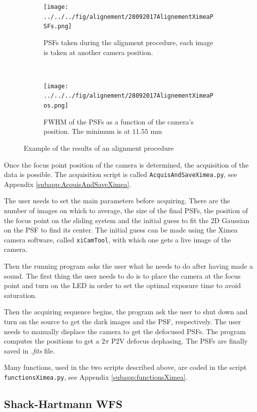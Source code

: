 \begin{figure}
\centering
    \begin{subfigure}{\textwidth}
        \texttt{[image: ../../../fig/alignement/28092017AlignementXimeaPSFs.png]}
        \caption{PSFs taken during the alignment procedure, each image is taken at another camera position.}
        \label{subfig:28092017AlignementXimeaPSFs}
    \end{subfigure}
    \\
    \begin{subfigure}{0.6\textwidth}
        \texttt{[image: ../../../fig/alignement/28092017AlignementXimeaPos.png]}
        \caption{FWHM of the PSFs as a function of the camera's position. The minimum is at $11.55$ mm}
        \label{subfig:28092017AlignementXimeaPos}
    \end{subfigure}
    \decoRule
    \caption{Example of the results of an alignment procedure}
\end{figure}

Once the focus point position of the camera is determined, the acquisition of the data is possible. The acquisition script is called \verb!AcquisAndSaveXimea.py!, see Appendix \ref{subapp:AcquisAndSaveXimea}.

The user needs to set the main parameters before acquiring. There are the number of images on which to average, the size of the final PSFs, the position of the focus point on the sliding system and the initial guess to fit the 2D Gaussian on the PSF to find its center. The initial guess can be made using the Ximea camera software, called \verb!xiCamTool!, with which one gets a live image of the camera.

Then the running program asks the user what he needs to do after having made a sound. The first thing the user needs to do is to place the camera at the focus point and turn on the LED in order to set the optimal exposure time to avoid saturation.

Then the acquiring sequence begins, the program ask the user to shut down and turn on the source to get the dark images and the PSF, respectively. The user needs to manually displace the camera to get the defocused PSFs. The program computes the positions to get a $2\pi$ P2V defocus dephasing. The PSFs are finally saved in \textit{.fits} file.

Many functions, used in the two scripts described above, are coded in the script \verb!functionsXimea.py!, see Appendix \ref{subapp:functionsXimea}.

\subsection{Shack-Hartmann WFS}
\label{subsec:acquisSHwfs}

